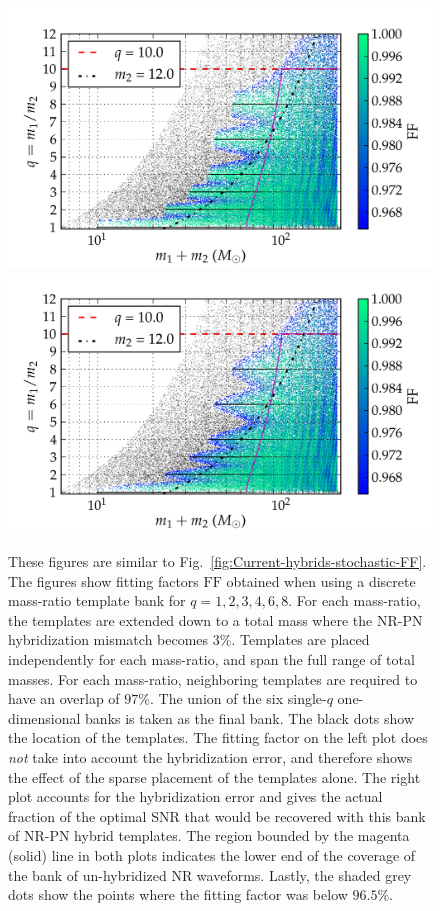 \documentclass[aps,
prd,
twocolumn,
superscriptaddress,
lengthcheck,showpacs,letterpaper,nofootinbib,
floatfix]{revtex4-1}
\newcommand{\FF}{\mathrm{FF}}
\begin{document}
\begin{figure}
\begin{center}
\includegraphics[width=\columnwidth]{bank_26022013_02_mtot200_logMq_NOhybMM-tiny.png}
\includegraphics[width=\columnwidth]{bank_26022013_02_mtot200_logMq_hybMM-tiny.png}
\caption{\label{fig:Current-hybrids-FF}These figures are similar to 
  Fig.~\ref{fig:Current-hybrids-stochastic-FF}. The figures show fitting
  factors $\FF$ obtained when using a discrete mass-ratio template bank for
  $q=1,2,3,4,6,8$. For each mass-ratio, the templates are extended down 
  to a total mass where the NR-PN hybridization mismatch becomes
  $3\%$. Templates are placed independently for each mass-ratio, and span the 
  full range of total masses. For each mass-ratio, neighboring templates are 
  required to have an overlap of $97\%$. The union of the six single-$q$ 
  one-dimensional banks is taken as the final bank. The black dots show the 
  location of the templates. The fitting factor on the left plot does 
  {\em not} take into account the hybridization error, and therefore shows the
  effect of the sparse placement of the templates alone. The right plot accounts
  for the hybridization error
  and gives the actual fraction of the optimal SNR that would be recovered
  with this bank of NR-PN hybrid templates. The region bounded by the magenta 
  (solid) line in both plots indicates the lower end of the coverage of the 
  bank of un-hybridized NR waveforms. Lastly, the shaded grey dots show the 
  points where the fitting factor was below $96.5\%$.}
\end{center}
\end{figure}
\end{document}
